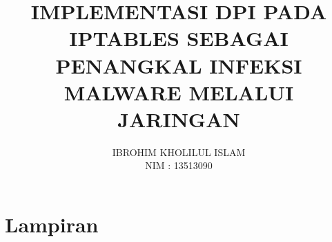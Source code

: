 \documentclass[12pt, a4paper, onecolumn, oneside, final]{report}
\begin{document}
\title{IMPLEMENTASI DPI PADA IPTABLES SEBAGAI PENANGKAL INFEKSI MALWARE MELALUI JARINGAN}
\date{}
\author{IBROHIM KHOLILUL ISLAM\\
NIM : 13513090}




\setcounter{page}{0}

\pagestyle{plain}




\clearpage

\tableofcontents
\clearpage
\listoffigures
\clearpage
\listoftables
\clearpage

\setcounter{page}{1}












\printbibliography

\appendix
{}
\part*{Lampiran}



\end{document}
